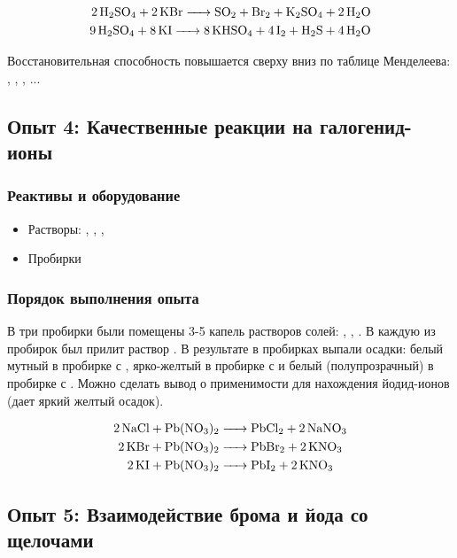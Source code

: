 \documentclass[a4paper, 12pt]{article}
\begin{document}
\begin{align}
	\ce{2H2SO4 + 2 KBr -> SO2 + Br2 + K2SO4 + 2H2O}\\
	\ce{9H2SO4 + 8 KI -> 8KHSO4 + 4 I2 + H2S + 4H2O}
\end{align}

Восстановительная способность повышается сверху вниз по таблице Менделеева: , , , ...


\subsection{Опыт 4: Качественные реакции на галогенид-ионы}

\subsubsection{Реактивы и оборудование}

\begin{itemize}
	\item Растворы: , , , 
	
	\item Пробирки
\end{itemize}

\subsubsection{Порядок выполнения опыта}

В три пробирки были помещены 3-5 капель растворов солей: , , . В каждую из пробирок был прилит раствор . В результате в пробирках выпали осадки: белый мутный в пробирке с , ярко-желтый в пробирке с  и белый (полупрозрачный) в пробирке с . Можно сделать вывод о применимости  для нахождения йодид-ионов (дает яркий желтый осадок).

\begin{align}
	\ce{2NaCl + Pb(NO3)2 &-> PbCl2 + 2 NaNO3}\\
	\ce{2KBr + Pb(NO3)2 &-> PbBr2 + 2 KNO3}\\
	\ce{2KI + Pb(NO3)2 &-> PbI2 + 2 KNO3}\\
\end{align}


\subsection{Опыт 5: Взаимодействие брома и йода со щелочами}
\end{document}
